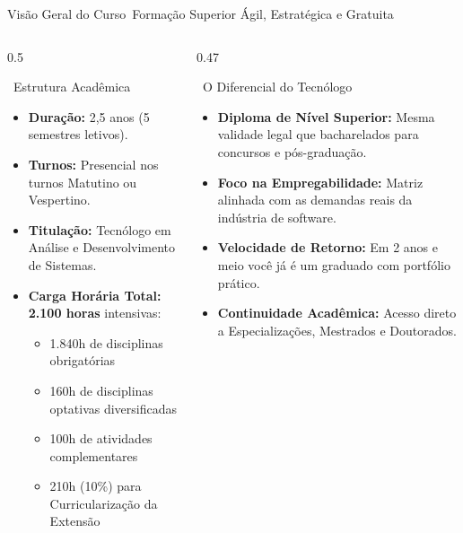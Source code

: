\begin{frame}{Visão Geral do Curso}{\faClock\ Formação Superior Ágil, Estratégica e Gratuita}
  \begin{columns}[t]
    \begin{column}{0.5\textwidth}
      \begin{greencard}{\faCheckCircle\ Estrutura Acadêmica}
        \begin{itemize}\setlength{\itemsep}{0.25em}\footnotesize
          \item \textbf{Duração:} 2,5 anos (5 semestres letivos).
          \item \textbf{Turnos:} Presencial nos turnos Matutino ou Vespertino.
          \item \textbf{Titulação:} Tecnólogo em Análise e Desenvolvimento de Sistemas.
          \item \textbf{Carga Horária Total:} \textbf{2.100 horas} intensivas:
            \begin{itemize}\tiny
              \item 1.840h de disciplinas obrigatórias
              \item 160h de disciplinas optativas diversificadas
              \item 100h de atividades complementares
              \item 210h (10\%) para Curricularização da Extensão
            \end{itemize}
        \end{itemize}
      \end{greencard}
    \end{column}
    
    \begin{column}{0.47\textwidth}
      \begin{bluecard}{\faGraduationCap\ O Diferencial do Tecnólogo}
        \begin{itemize}\setlength{\itemsep}{0.25em}\footnotesize
          \item \textbf{Diploma de Nível Superior:} Mesma validade legal que bacharelados para concursos e pós-graduação.
          \item \textbf{Foco na Empregabilidade:} Matriz alinhada com as demandas reais da indústria de software.
          \item \textbf{Velocidade de Retorno:} Em 2 anos e meio você já é um graduado com portfólio prático.
          \item \textbf{Continuidade Acadêmica:} Acesso direto a Especializações, Mestrados e Doutorados.
        \end{itemize}
      \end{bluecard}
    \end{column}
  \end{columns}
\end{frame}
